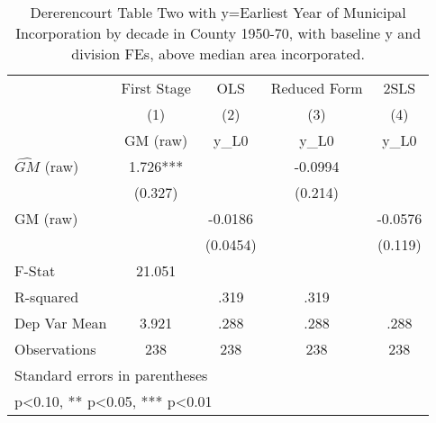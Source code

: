 \begin{table}[htbp]\centering
\def\sym#1{\ifmmode^{#1}\else\(^{#1}\)\fi}
\caption{Dererencourt Table Two with y=Earliest Year of Municipal Incorporation by decade in County 1950-70, with baseline y and division FEs, above median area incorporated.}
\begin{tabular}{l*{4}{c}}
\toprule
                    & First Stage   &         OLS   &Reduced Form   &        2SLS   \\
                    &\multicolumn{1}{c}{(1)}&\multicolumn{1}{c}{(2)}&\multicolumn{1}{c}{(3)}&\multicolumn{1}{c}{(4)}\\
                    &\multicolumn{1}{c}{GM  (raw)}&\multicolumn{1}{c}{y\_L0}&\multicolumn{1}{c}{y\_L0}&\multicolumn{1}{c}{y\_L0}\\
\midrule
$\hat{GM}$ (raw)    &       1.726***&               &     -0.0994   &               \\
                    &     (0.327)   &               &     (0.214)   &               \\
\addlinespace
GM  (raw)           &               &     -0.0186   &               &     -0.0576   \\
                    &               &    (0.0454)   &               &     (0.119)   \\
\midrule
F-Stat              &      21.051   &               &               &               \\
R-squared           &               &        .319   &        .319   &               \\
Dep Var Mean        &       3.921   &        .288   &        .288   &        .288   \\
Observations        &         238   &         238   &         238   &         238   \\
\bottomrule
\multicolumn{5}{l}{\footnotesize Standard errors in parentheses}\\
\multicolumn{5}{l}{\footnotesize * p<0.10, ** p<0.05, *** p<0.01}\\
\end{tabular}
\end{table}
